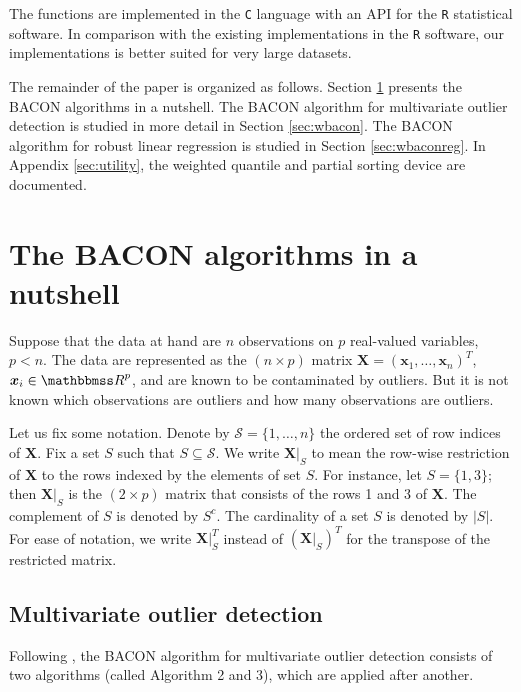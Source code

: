 \documentclass[a4paper,oneside,11pt,DIV=12]{scrartcl}
\newcommand{\code}[1]{{\texttt{#1}}}
\newcommand{\R}{{\mathbbmss R}}
\begin{document}
The functions are implemented in the \code{C} language with an API
for the \code{R} statistical software. In comparison with the existing
implementations in the \code{R} software, our implementations is better
suited for very large datasets.

The remainder of the paper is organized as follows. Section \ref{sec:nutshell}
presents the BACON algorithms in a nutshell. The BACON algorithm for
multivariate outlier detection is studied in more detail in Section
\ref{sec:wbacon}. The BACON algorithm for robust linear regression is studied
in Section \ref{sec:wbaconreg}. In Appendix \ref{sec:utility}, the weighted
quantile and partial sorting device are documented.

\section{The BACON algorithms in a nutshell}\label{sec:nutshell}
Suppose that the data at hand are $n$ observations on $p$ real-valued
variables, $p < n$. The data are represented as the $(n \times p)$
matrix $\bm X = (\bm x_1, \ldots, \bm x_n)^T$, $\bm x_i \in \R^p$,
and are known to be contaminated by outliers. But it is not known which
observations are outliers and how many observations are outliers.

Let us fix some notation. Denote by $\mathscr{S}=\{1, \ldots, n\}$ the
ordered set of row indices of $\bm X$. Fix a set $S$ such that
$S \subseteq \mathscr{S}$. We write $\bm X \vert_{S}$ to mean the
row-wise restriction of $\bm X$ to the rows indexed by the elements
of set $S$. For instance, let $S=\{1,3\}$; then $\bm X \vert_{S}$ is
the $(2 \times p)$ matrix that consists of the rows 1 and 3 of $\bm X$.
The complement of $S$ is denoted by $S^c$. The cardinality of a set $S$
is denoted by $\vert S \vert$. For ease of notation, we write
$\bm X \vert_S^T$ instead of $(\bm X \vert_S)^T$ for the transpose of
the restricted matrix.

\subsection{Multivariate outlier detection}
Following \citet{billor_hadi_etal_2000}, the BACON algorithm for multivariate
outlier detection consists of two algorithms (called Algorithm 2 and 3),
which are applied after another.
\end{document}
